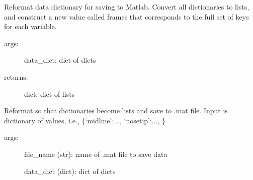 \documentclass[letterpaper,10pt,openany,oneside]{sphinxmanual}
\begin{document}

\begin{fulllineitems}
\label{index:readwrite.reformat}
Reformat data dictionary for saving to Matlab. Convert all dictionaries
to lists, and construct a new value called frames that corresponds to
the full set of keys for each variable.
\begin{description}
\item[{args:}] \leavevmode
data\_dict: dict of dicts

\item[{returns:}] \leavevmode
dict: dict of lists

\end{description}

\end{fulllineitems}


\begin{fulllineitems}
\label{index:readwrite.savemat}
Reformat so that dictionaries become lists and save to .mat file. 
Input is dictionary of values, i.e., \{`midline':..., `nosetip':..., \}
\begin{description}
\item[{args:}] \leavevmode
file\_name (str): name of .mat file to save data

data\_dict (dict): dict of dicts

\end{description}

\end{fulllineitems}

\end{document}
